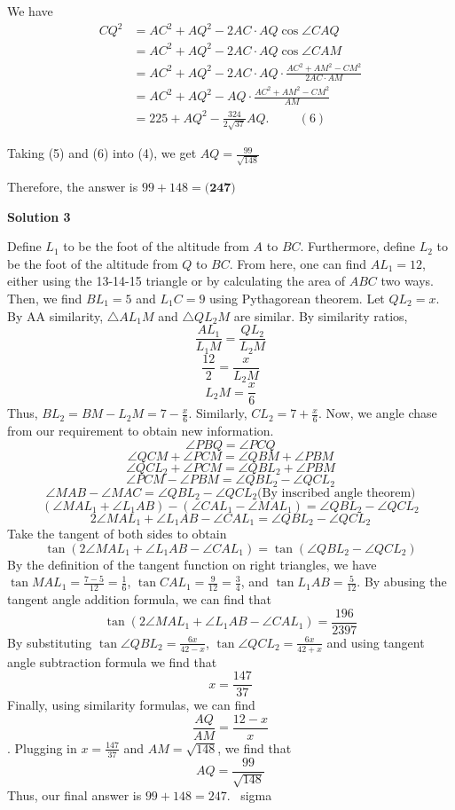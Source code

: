 \begin{enumerate}
 We have
 \begin{align*} CQ^2 & = AC^2 + AQ^2 - 2 AC\cdot AQ \cos \angle CAQ \\ & = AC^2 + AQ^2 - 2 AC\cdot AQ \cos \angle CAM \\ & = AC^2 + AQ^2 - 2 AC\cdot AQ \cdot \frac{AC^2 + AM^2 - CM^2}{2 AC \cdot AM} \\ & = AC^2 + AQ^2 -  AQ \cdot \frac{AC^2 + AM^2 - CM^2}{AM} \\ & = 225 + AQ^2 - \frac{324}{2 \sqrt{37}} AQ .  \hspace{1cm} (6) \end{align*}


 Taking (5) and (6) into (4), we get $AQ = \frac{99}{\sqrt{148}}$

 Therefore, the answer is $99 + 148 = \boxed{\textbf{(247) }}$




\textbf{Solution 3}

Define $L_1$ to be the foot of the altitude from $A$ to $BC$. Furthermore, define $L_2$ to be the foot of the altitude from $Q$ to $BC$. From here, one can find $AL_1=12$, either using the 13-14-15 triangle or by calculating the area of $ABC$ two ways. Then, we find $BL_1=5$ and $L_1C = 9$ using Pythagorean theorem. Let $QL_2=x$. By AA similarity, $\triangle{AL_1M}$ and $\triangle{QL_2M}$ are similar. By similarity ratios, 
 \[\frac{AL_1}{L_1M}=\frac{QL_2}{L_2M}\]
 \[\frac{12}{2}=\frac{x}{L_2M}\]
 \[L_2M = \frac{x}{6}\]Thus, $BL_2=BM-L_2M=7-\frac{x}{6}$. Similarly, $CL_2=7+\frac{x}{6}$. Now, we angle chase from our requirement to obtain new information.
 \[\angle{PBQ}=\angle{PCQ}\]
 \[\angle{QCM}+\angle{PCM}=\angle{QBM}+\angle{PBM}\]
 \[\angle{QCL_2}+\angle{PCM}=\angle{QBL_2}+\angle{PBM}\]
 \[\angle{PCM}-\angle{PBM}=\angle{QBL_2}-\angle{QCL_2}\]
 \[\angle{MAB}-\angle{MAC}=\angle{QBL_2}-\angle{QCL_2}\text{(By inscribed angle theorem)}\] 
 \[(\angle{MAL_1}+\angle{L_1AB})-(\angle{CAL_1}-\angle{MAL_1})=\angle{QBL_2}-\angle{QCL_2}\]
 \[2\angle{MAL_1}+\angle{L_1AB}-\angle{CAL_1}=\angle{QBL_2}-\angle{QCL_2}\]Take the tangent of both sides to obtain 
 \[\tan(2\angle{MAL_1}+\angle{L_1AB}-\angle{CAL_1})=\tan(\angle{QBL_2}-\angle{QCL_2})\]By the definition of the tangent function on right triangles, we have $\tan{MAL_1}=\frac{7-5}{12}=\frac{1}{6}$, $\tan{CAL_1}=\frac{9}{12}=\frac{3}{4}$, and $\tan{L_1AB}=\frac{5}{12}$. By abusing the tangent angle addition formula, we can find that 
 \[\tan(2\angle{MAL_1}+\angle{L_1AB}-\angle{CAL_1})=\frac{196}{2397}\]By substituting $\tan{\angle{QBL_2}}=\frac{6x}{42-x}$, $\tan{\angle{QCL_2}}=\frac{6x}{42+x}$ and using tangent angle subtraction formula we find that 
 \[x=\frac{147}{37}\]Finally, using similarity formulas, we can find 
 \[\frac{AQ}{AM}=\frac{12-x}{x}\]. Plugging in $x=\frac{147}{37}$ and $AM=\sqrt{148}$, we find that 
 \[AQ=\frac{99}{\sqrt{148}}\] Thus, our final answer is $99+148=\boxed{247}$. ~sigma


\end{enumerate}
